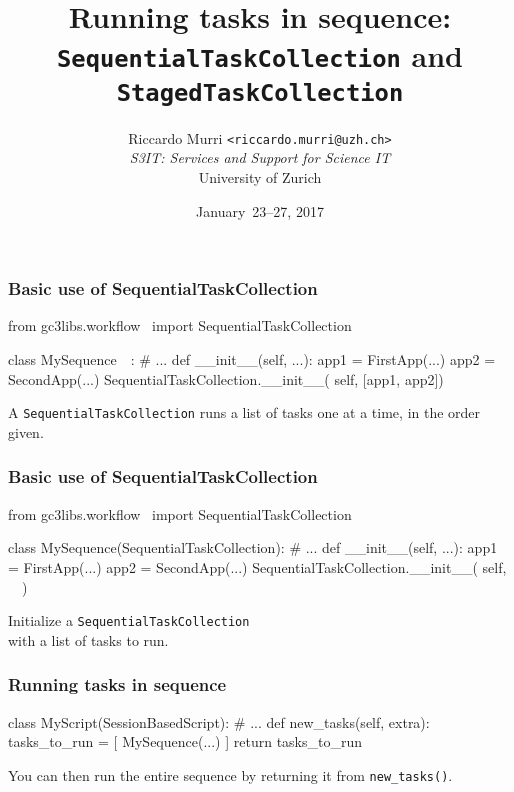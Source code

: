 \documentclass[english,serif,mathserif,xcolor=pdftex,dvipsnames,table]{beamer}
\title[Sequencing tasks]{%
  Running tasks in sequence: \\
  \texttt{SequentialTaskCollection} and \texttt{StagedTaskCollection}
}
\author[R. Murri, S3IT UZH]{%
  Riccardo Murri \texttt{<riccardo.murri@uzh.ch>}
  \\[1ex]
  \emph{S3IT: Services and Support for Science IT}
  \\[1ex]
  University of Zurich
}
\date{January~23--27, 2017}
\begin{document}
\maketitle


\begin{frame}[fragile]
  \frametitle{Basic use of SequentialTaskCollection}

\begin{python}
from gc3libs.workflow \
  import SequentialTaskCollection

class MySequence~~:
  # ...
  def __init__(self, ...):
    app1 = FirstApp(...)
    app2 = SecondApp(...)
    SequentialTaskCollection.__init__(
      self, [app1, app2])
\end{python}

  \+
  A \texttt{SequentialTaskCollection} runs a list of tasks one at a time, in the order given.
\end{frame}


\begin{frame}[fragile]
  \frametitle{Basic use of SequentialTaskCollection}

\begin{python}
from gc3libs.workflow \
  import SequentialTaskCollection

class MySequence(SequentialTaskCollection):
  # ...
  def __init__(self, ...):
    app1 = FirstApp(...)
    app2 = SecondApp(...)
    SequentialTaskCollection.__init__(
      self, ~~)
\end{python}

  \+
  Initialize a \texttt{SequentialTaskCollection} \\
  with a list of tasks to run.
\end{frame}


\begin{frame}[fragile]
  \frametitle{Running tasks in sequence}

\begin{python}
class MyScript(SessionBasedScript):
  # ...
  def new_tasks(self, extra):
    tasks_to_run = [
      MySequence(...)
    ]
    return tasks_to_run
\end{python}

  \+ You can then run the entire sequence by returning it from
  \lstinline|new_tasks()|.
\end{frame}
\end{document}
